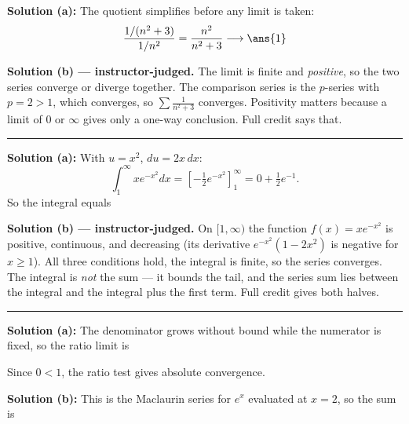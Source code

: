 \documentclass[12pt]{article}
\begin{document}



\textbf{Solution (a):} The quotient simplifies before any limit is taken:
\[ \frac{1/(n^{2}+3)}{1/n^{2}} = \frac{n^{2}}{n^{2}+3} \longrightarrow \ans{1} \]

\textbf{Solution (b) --- instructor-judged.} The limit is finite and \emph{positive}, so the two series converge or diverge together. The comparison series is the $p$-series with $p = 2 > 1$, which converges, so $\sum \frac{1}{n^2+3}$ converges. Positivity matters because a limit of $0$ or $\infty$ gives only a one-way conclusion. Full credit says that.

\vspace{0.2cm}\noindent\rule{\linewidth}{0.2pt}\vspace{0.2cm}


\textbf{Solution (a):} With $u = x^2$, $du = 2x\,dx$:
\[ \int_1^{\infty} xe^{-x^{2}}dx = \left[-\tfrac{1}{2}e^{-x^{2}}\right]_1^{\infty} = 0 + \tfrac{1}{2}e^{-1}. \]
So the integral equals 

\textbf{Solution (b) --- instructor-judged.} On $[1,\infty)$ the function $f(x) = xe^{-x^2}$ is positive, continuous, and decreasing (its derivative $e^{-x^2}(1-2x^2)$ is negative for $x \ge 1$). All three conditions hold, the integral is finite, so the series converges. The integral is \emph{not} the sum --- it bounds the tail, and the series sum lies between the integral and the integral plus the first term. Full credit gives both halves.

\vspace{0.2cm}\noindent\rule{\linewidth}{0.2pt}\vspace{0.2cm}


\textbf{Solution (a):} The denominator grows without bound while the numerator is fixed, so the ratio limit is 

Since $0 < 1$, the ratio test gives absolute convergence.

\textbf{Solution (b):} This is the Maclaurin series for $e^{x}$ evaluated at $x = 2$, so the sum is 
\end{document}
